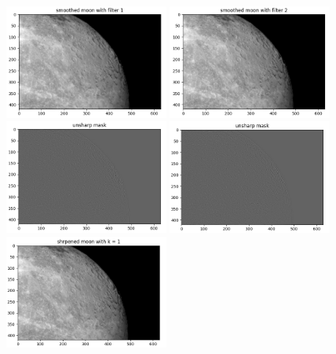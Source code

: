 \begin{figure}[htbp]
    \centering
	\includegraphics[width=0.48\textwidth]{../images/p2/p2c_smooth_1.png}
    \includegraphics[width=0.48\textwidth]{../images/p2/p2c_smooth_2.png}
	\includegraphics[width=0.48\textwidth]{../images/p2/p2c_unsharp_1.png}
	\includegraphics[width=0.48\textwidth]{../images/p2/p2c_unsharp_2.png}
	\includegraphics[width=0.48\textwidth]{../images/p2/p2c_sharpened_1_1.png}

\end{figure}
